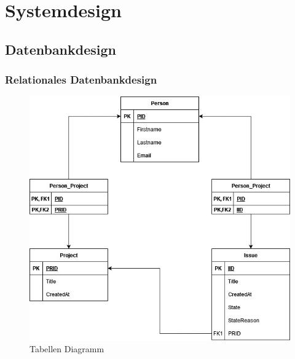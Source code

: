 \chapter{Systemdesign} %
\label{sec:systemdesign}

\section{Datenbankdesign} %
\label{sec:datenbankdesign}
\subsection{Relationales Datenbankdesign} %
\label{sec:relationalesdatenbankdesign}
\begin{figure}[h!]
	\centering
	\includegraphics[scale=0.7]{Illustrations/table_diagram.jpg}
	\caption{Tabellen Diagramm}
\end{figure}


